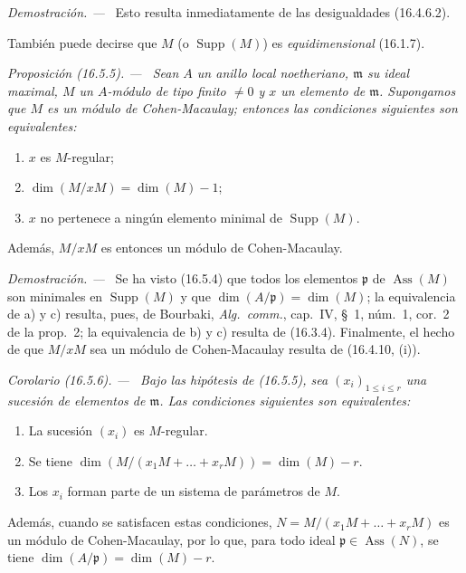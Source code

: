 \documentclass[10pt,oneside]{book}
\makeatletter
\newcommand{\setmanualcurrentlabel}[1]{\def\@currentlabel{#1}}
\newcommand{\oldpage}[2][]{%
  \setcounter{footnote}{0}%
  \marginpar{\scriptsize\textbf{#1}~|~#2}\ignorespaces}
\newenvironment{proposition}[1][]{%
  \setmanualcurrentlabel{#1}\par\medskip\noindent\itshape Proposición (#1). ---\ }{\par}
\newenvironment{corollary}[1][]{%
  \setmanualcurrentlabel{#1}\par\medskip\noindent\itshape Corolario (#1). ---\ }{\par}
\newenvironment{proof}{%
  \par\medskip\noindent\textit{Demostración. ---\ }}{\par}
\providecommand{\setmin}{-}%
\makeatother
\begin{document}
\begin{proof}
Esto resulta inmediatamente de las desigualdades (16.4.6.2).
\end{proof}

También puede decirse que $M$ (o $\operatorname{Supp}(M)$) es
\emph{equidimensional} (16.1.7).

\oldpage[0\textsubscript{IV-1}]{37}

\begin{proposition}[16.5.5]
\label{0.16.5.5-es}
Sean $A$ un anillo local noetheriano, $\mathfrak{m}$ su ideal maximal, $M$
un $A$-módulo de tipo finito $\neq0$ y $x$ un elemento de $\mathfrak{m}$.
Supongamos que $M$ es un módulo de Cohen-Macaulay; entonces las condiciones
siguientes son equivalentes:
\begin{enumerate}
  \item[\textup{a)}] $x$ es $M$-regular;
  \item[\textup{b)}] $\dim(M/xM)=\dim(M)\setmin 1$;
  \item[\textup{c)}] $x$ no pertenece a ningún elemento minimal de
  $\operatorname{Supp}(M)$.
\end{enumerate}
Además, $M/xM$ es entonces un módulo de Cohen-Macaulay.
\end{proposition}

\begin{proof}
Se ha visto (16.5.4) que todos los elementos $\mathfrak{p}$ de
$\operatorname{Ass}(M)$ son minimales en $\operatorname{Supp}(M)$ y que
$\dim(A/\mathfrak{p})=\dim(M)$; la equivalencia de a) y c) resulta, pues, de
Bourbaki, \emph{Alg.~comm.}, cap.~IV, \S~1, núm.~1, cor.~2 de la prop.~2;
la equivalencia de b) y c) resulta de (16.3.4). Finalmente, el hecho de que
$M/xM$ sea un módulo de Cohen-Macaulay resulta de (16.4.10, (i)).
\end{proof}

\begin{corollary}[16.5.6]
\label{0.16.5.6-es}
Bajo las hipótesis de \textup{(16.5.5)}, sea $(x_i)_{1\leq i\leq r}$ una sucesión
de elementos de $\mathfrak{m}$. Las condiciones siguientes son equivalentes:
\begin{enumerate}
  \item[\textup{a)}] La sucesión $(x_i)$ es $M$-regular.
  \item[\textup{b)}] Se tiene
  $\dim(M/(x_1M+\ldots+x_rM))=\dim(M)\setmin r$.
  \item[\textup{c)}] Los $x_i$ forman parte de un sistema de parámetros de $M$.
\end{enumerate}
Además, cuando se satisfacen estas condiciones,
$N=M/(x_1M+\ldots+x_rM)$ es un módulo de Cohen-Macaulay, por lo que, para todo
ideal $\mathfrak{p}\in\operatorname{Ass}(N)$, se tiene
$\dim(A/\mathfrak{p})=\dim(M)\setmin r$.
\end{corollary}
\end{document}
